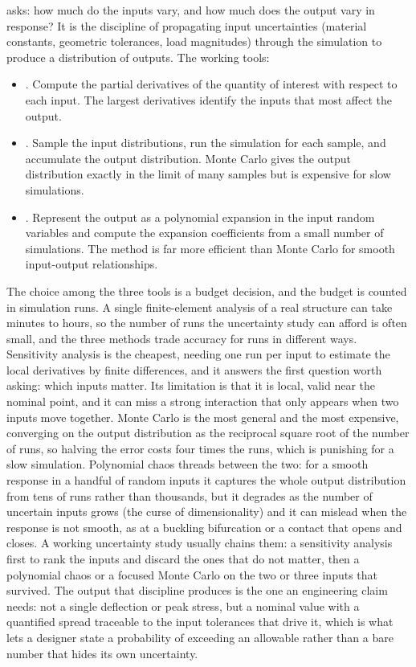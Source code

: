  asks: how much do the inputs
vary, and how much does the output vary in response? It is the
discipline of propagating input uncertainties (material constants,
geometric tolerances, load magnitudes) through the simulation to
produce a distribution of outputs. The working tools:

\begin{itemize}[leftmargin=*]
  \item {}. Compute the partial
    derivatives of the quantity of interest with respect to each
    input. The largest derivatives identify the inputs that most
    affect the output.
  \item {}. Sample the input
    distributions, run the simulation for each sample, and
    accumulate the output distribution. Monte Carlo gives the
    output distribution exactly in the limit of many samples but
    is expensive for slow simulations.
  \item {}. Represent the
    output as a polynomial expansion in the input random variables
    and compute the expansion coefficients from a small number of
    simulations. The method is far more efficient than Monte Carlo
    for smooth input-output relationships.
\end{itemize}

The choice among the three tools is a budget decision, and the budget is
counted in simulation runs. A single finite-element analysis of a real
structure can take minutes to hours, so the number of runs the uncertainty
study can afford is often small, and the three methods trade accuracy for
runs in different ways. Sensitivity analysis is the cheapest, needing one
run per input to estimate the local derivatives by finite differences, and
it answers the first question worth asking: which inputs matter. Its
limitation is that it is local, valid near the nominal point, and it can
miss a strong interaction that only appears when two inputs move together.
Monte Carlo is the most general and the most expensive, converging on the
output distribution as the reciprocal square root of the number of runs, so
halving the error costs four times the runs, which is punishing for a slow
simulation. Polynomial chaos threads between the two: for a smooth response
in a handful of random inputs it captures the whole output distribution from
tens of runs rather than thousands, but it degrades as the number of
uncertain inputs grows (the curse of dimensionality) and it can mislead when
the response is not smooth, as at a buckling bifurcation or a contact that
opens and closes. A working uncertainty study usually chains them: a
sensitivity analysis first to rank the inputs and discard the ones that do
not matter, then a polynomial chaos or a focused Monte Carlo on the two or
three inputs that survived. The output that discipline produces is the one an
engineering claim needs: not a single deflection or peak stress, but a
nominal value with a quantified spread traceable to the input tolerances
that drive it, which is what lets a designer state a probability of
exceeding an allowable rather than a bare number that hides its own
uncertainty.

